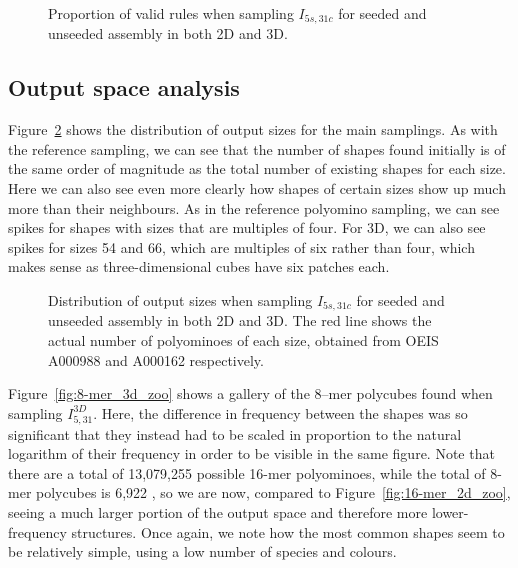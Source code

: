 \begin{figure}[h]
    \centering
    \caption{Proportion of valid rules when sampling \(I_{5s,31c}\) for seeded and unseeded assembly in both 2D and 3D.}
    \label{fig:valid_proportion}
\end{figure}

\subsection{Output space analysis}
Figure~\ref{fig:main_distr} shows the distribution of output sizes for the main samplings. As with the reference sampling, we can see that the number of shapes found initially is of the same order of magnitude as the total number of existing shapes for each size. Here we can also see even more clearly how shapes of certain sizes show up much more than their neighbours. 
As in the reference polyomino sampling, we can see spikes for shapes with sizes that are multiples of four. For 3D, we can also see spikes for sizes 54 and 66, which are multiples of six rather than four, which makes sense as three-dimensional cubes have six patches each.

\begin{figure}[h]
    \centering
    \caption{Distribution of output sizes when sampling \(I_{5s,31c}\) for seeded and unseeded assembly in both 2D and 3D. The red line shows the actual number of polyominoes of each size, obtained from OEIS A000988 and A000162 \cite{sloane1995encyclopedia, oeisA000988} respectively.}
    \label{fig:main_distr}
\end{figure}

Figure~\ref{fig:8-mer_3d_zoo} shows a gallery of the 8--mer polycubes found when sampling \(I_{5,31}^{3D}\). Here, the difference in frequency between the shapes was so significant that they instead had to be scaled in proportion to the natural logarithm of their frequency in order to be visible in the same figure. Note that there are a total of 13,079,255 possible 16-mer polyominoes, while the total of 8-mer polycubes is 6,922 \cite{sloane1995encyclopedia, oeisA000988}, so we are now, compared to Figure~\ref{fig:16-mer_2d_zoo}, seeing a much larger portion of the output space and therefore more lower-frequency structures. Once again, we note how the most common shapes seem to be relatively simple, using a low number of species and colours.


